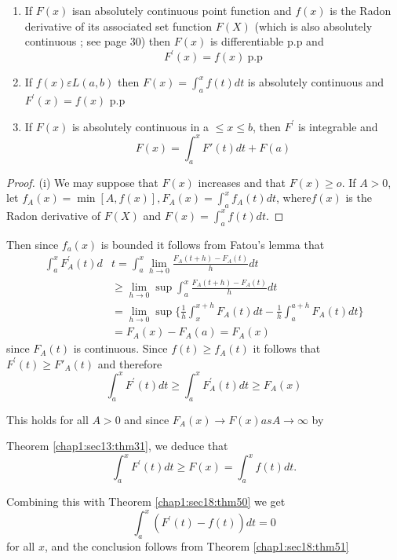 \begin{theorem}\label{chap1:sec18:thm53}
\begin{enumerate}
\renewcommand{\theenumi}{\roman{enumi}}
\renewcommand{\labelenumi}{\rm (\theenumi)}
\item If $F(x)$ is\break an absolutely continuous point function and $f(x)$
  is the Radon derivative of its associated set function $F(X)$ (which is also
  absolutely continuous ; see page 30) then $F(x)$ is differentiable p.p
  and  
  $$ 
  F^{'}(x)=f(x) ~\text{p.p}
  $$ 
\item If $f(x) \varepsilon  L(a,b)$ then $F(x)= \int ^{x}_{a}f(t)dt$
  is absolutely continuous and $F^{'}(x)=f(x)$ p.p 
\item If $F(x)$ is absolutely continuous in a $\leq  x\leq b$, then
  $F^{'}$ is integrable and  
  $$
  F(x)=\int^x_a F'(t) dt + F(a)
  $$
\end{enumerate}
\end{theorem}

\begin{proof}
 (i) We may suppose that $F(x)$ increases and
  that $F(x)\geq o$. If $A > 0$, let 
$f_A(x)= \min [A,f(x)], F_A(x)=\int^x_af_A(t)dt$,
where\pageoriginale $f(x)$ is the Radon derivative of $F(X)$ and $F(x)=\int^x_a
f(t)dt$. 
\end{proof}

Then since $f_a(x)$ is bounded it follows from Fatou's lemma that 
\begin{align*}
  \int^x_aF^{'}_A(t)d &t=\int^x_a\lim\limits_{h \rightarrow
    0}\frac{F_A(t+h)-F_A(t)}{h}dt\\  
  &\ge \lim\limits_{h \rightarrow 0}\sup\int^x_a\frac{F_A(t+h)-F_A(t)}{h}dt\\ 
  &= \lim\limits_{h \rightarrow 0}\sup\bigg\{\frac{1}{h}\int^{x+h}_x
  F_A(t)dt-\frac{1}{h}\int^{a+h}_aF_A(t)dt\bigg\}\\ 
  &=F_A(x)-F_A(a)=F_A(x)
\end{align*}
since $F_A(t)$ is continuous. Since $f(t)\ge f_A(t)$ it follows that
$F^{'}(t)\ge F'_A(t)$ and therefore 
$$
\int^x_a F^{'}(t)dt\ge\int^x_aF_A^{'}(t) dt \ge F_A(x)
$$

This holds for all $A >0$ and since $F_A(x)\rightarrow F(x)as A
\rightarrow\infty$ by 

Theorem \ref{chap1:sec13:thm31}, we deduce that
$$
\int^x_a F^{'}(t)dt\ge F(x) =\int^x_a f(t)dt.
$$

Combining this with Theorem \ref{chap1:sec18:thm50} we get
$$
\int^x_a (F^{'}(t)-f(t)) dt =0
$$
for all $x$, and the conclusion follows from Theorem \ref{chap1:sec18:thm51}

